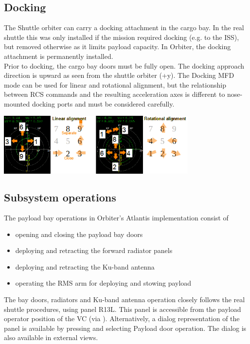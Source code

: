 \subsection{Docking}
The Shuttle orbiter can carry a docking attachment in the cargo bay. In the real shuttle this was only installed if the mission required docking (e.g. to the ISS), but removed otherwise as it limits payload capacity. In Orbiter, the docking attachment is permanently installed.\\

Prior to docking, the cargo bay doors must be fully open. The docking approach direction is upward as seen from the shuttle orbiter (+y). The Docking MFD mode can be used for linear and rotational alignment, but the relationship between RCS commands and the resulting acceleration axes is different to nose-mounted docking ports and must be considered carefully.

\begin{center}
\includegraphics[width=0.75\textwidth]{Images//Pic6.png}
\end{center}

\break
\subsection{Subsystem operations}

The payload bay operations in Orbiter’s Atlantis implementation consist of
\begin{itemize} 
\item opening and closing the payload bay doors
\item deploying and retracting the forward radiator panels
\item deploying and retracting the Ku-band antenna
\item operating the RMS arm for deploying and stowing payload
\end{itemize}

The bay doors, radiators and Ku-band antenna operation closely follows the real shuttle procedures, using panel R13L. This panel is accessible from the payload operator position of the VC (via \ks{$\leftarrow$}). Alternatively, a dialog representation of the panel is available by pressing  and selecting Payload door operation. The dialog is also available in external views.

